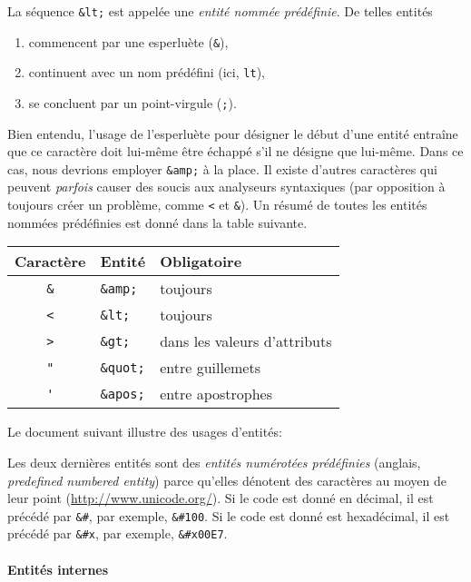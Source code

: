 La séquence \verb|&lt;| est appelée une \emph{entité nommée
  prédéfinie}. De telles entités
\begin{enumerate}

  \item commencent par une esperluète (\verb|&|),

  \item continuent avec un nom prédéfini (ici, \texttt{lt}),

  \item se concluent par un point-virgule (\texttt{;}).

\end{enumerate}
Bien entendu, l'usage de l'esperluète pour désigner le début d'une
entité entraîne que ce caractère doit lui-même être échappé s'il ne
désigne que lui-même. Dans ce cas, nous devrions employer \verb|&amp;|
à la place. Il existe d'autres caractères qui peuvent \emph{parfois}
causer des soucis aux analyseurs syntaxiques \XML (par opposition à
toujours créer un problème, comme \verb|<| et \verb|&|). Un résumé de
toutes les entités nommées prédéfinies est donné dans la table
suivante.
\begin{center}
\begin{tabular}{cll}
\toprule
\textsf{Caractère} & \textsf{Entité} & \textsf{Obligatoire}\\
\midrule
\verb|&| & \verb|&amp;|  & toujours\\
\verb|<| & \verb|&lt;|   & toujours\\
\verb|>| & \verb|&gt;|   & dans les valeurs d'attributs\\
\verb|"| & \verb|&quot;| & entre guillemets\\
\verb|'| & \verb|&apos;| & entre apostrophes\\
\bottomrule
\end{tabular}
\end{center}

\noindent Le document suivant illustre des usages d'entités:

\noindent Les deux dernières entités sont des \emph{entités numérotées
  prédéfinies} (anglais, \emph{predefined numbered entity}) parce
qu'elles dénotent des caractères au moyen de leur point \Unicode
(\url{http://www.unicode.org/}). Si le code est donné en décimal, il
est précédé par \verb|&#|, par exemple, \verb|&#100|.  Si le code est
donné est hexadécimal, il est précédé par \verb|&#x|, par exemple,
\verb|&#x00E7|.

\paragraph{Entités internes}

